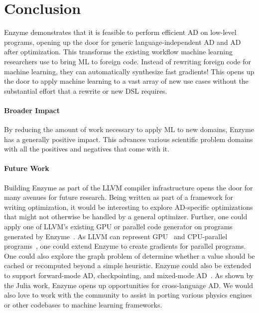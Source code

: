 \section{Conclusion}
\label{sec:conclusion}
Enzyme demonstrates that it is feasible to perform efficient AD on low-level programs, opening up the door for generic language-independent AD and AD after optimization. This transforms the existing workflow machine learning researchers use to bring ML to foreign code. Instead of rewriting foreign code for machine learning, they can automatically synthesize fast gradients! This opens up the door to apply machine learning to a vast array of new use cases without the substantial effort that a rewrite or new DSL requires.

\paragraph{Broader Impact}
By reducing the amount of work necessary to apply ML to new domains, Enzyme has a generally positive impact. This advances various scientific problem domains with all the positives and negatives that come with it.

\paragraph{Future Work}
Building Enzyme as part of the LLVM compiler infrastructure opens the door for many avenues for future research. Being written as part of a framework for writing optimization, it would be interesting to explore AD-specific optimizations that might not otherwise be handled by a general optimizer. Further, one could apply one of LLVM's existing GPU or parallel code generator  on programs generated by Enzyme~\cite{grosser2011polly, gysi2020domain}. As LLVM can represent GPU~\cite{rhodin2010ptx, holewinski2011ptx} and CPU-parallel programs~\cite{tapir, doerfert2018compiler}, one could extend Enzyme to create gradients for parallel programs. One could also explore the graph problem of determine whether a value should be cached or recomputed beyond a simple heuristic. Enzyme could also be extended to support forward-mode AD, checkpointing, and mixed-mode AD~\cite{mmarxiv}. As shown by the Julia work, Enzyme opens up opportunities for cross-language AD. We would also love to work with the community to assist in porting various physics engines or other codebases to machine learning frameworks.


 


